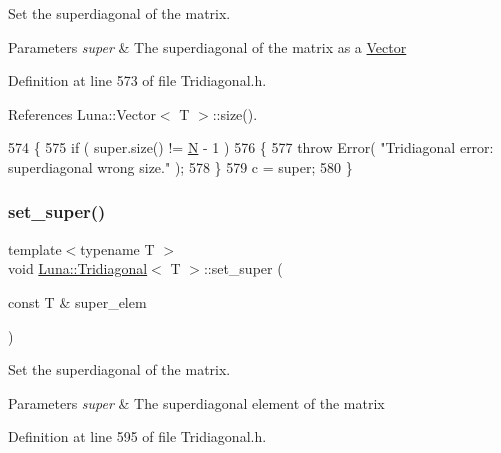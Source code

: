Set the superdiagonal of the matrix. 


\begin{DoxyParams}{Parameters}
{\em super} & The superdiagonal of the matrix as a \hyperlink{classLuna_1_1Vector}{Vector} \\
\hline
\end{DoxyParams}


Definition at line 573 of file Tridiagonal.\+h.



References Luna\+::\+Vector$<$ T $>$\+::size().


\begin{DoxyCode}
574   \{
575     \textcolor{keywordflow}{if} ( super.size() != \hyperlink{namespaceHeat__plot_a7d050092798e28458a263710837bda77}{N} - 1 )
576     \{
577       \textcolor{keywordflow}{throw} Error( \textcolor{stringliteral}{"Tridiagonal error: superdiagonal wrong size."} );
578     \}
579     c = super;
580   \}
\end{DoxyCode}
\mbox{\label{classLuna_1_1Tridiagonal_a956689dcbe76a4b23fa10192a7e1a8f9}} 
\subsubsection{\texorpdfstring{set\+\_\+super()}{set\_super()}\hspace{0.1cm}{\footnotesize\ttfamily [2/2]}}
{\footnotesize\ttfamily template$<$typename T $>$ \\
void \hyperlink{classLuna_1_1Tridiagonal}{Luna\+::\+Tridiagonal}$<$ T $>$\+::set\+\_\+super (\begin{DoxyParamCaption}\item[{const T \&}]{super\+\_\+elem }\end{DoxyParamCaption})\hspace{0.3cm}{\ttfamily [inline]}}



Set the superdiagonal of the matrix. 


\begin{DoxyParams}{Parameters}
{\em super} & The superdiagonal element of the matrix \\
\hline
\end{DoxyParams}


Definition at line 595 of file Tridiagonal.\+h.


